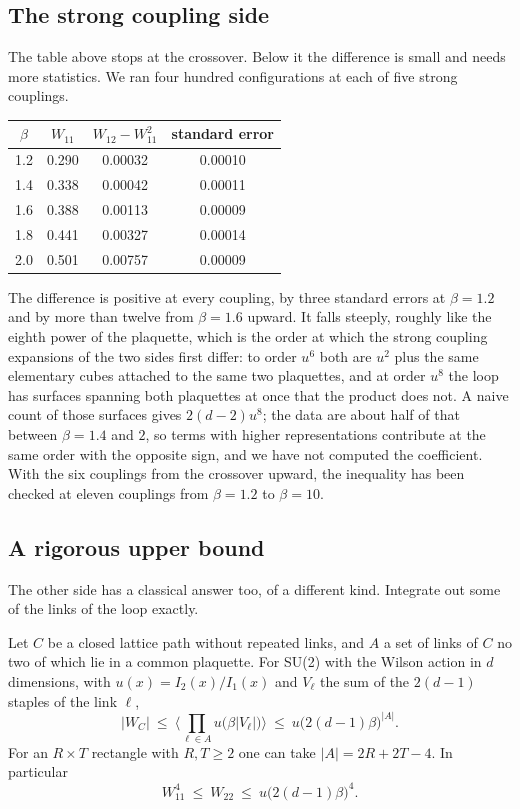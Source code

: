 \subsection{The strong coupling side}

The table above stops at the crossover. Below it the difference is small and needs more statistics. We ran four hundred configurations at each of five strong couplings.

\begin{center}
\small
\begin{tabular}{cccc}
\toprule
$\beta$ & $W_{11}$ & $W_{12}-W_{11}^2$ & standard error \\ \midrule
1.2 & 0.290 & 0.00032 & 0.00010 \\
1.4 & 0.338 & 0.00042 & 0.00011 \\
1.6 & 0.388 & 0.00113 & 0.00009 \\
1.8 & 0.441 & 0.00327 & 0.00014 \\
2.0 & 0.501 & 0.00757 & 0.00009 \\
\bottomrule
\end{tabular}
\end{center}

The difference is positive at every coupling, by three standard errors at $\beta=1.2$ and by more than twelve from $\beta=1.6$ upward. It falls steeply, roughly like the eighth power of the plaquette, which is the order at which the strong coupling expansions of the two sides first differ: to order $u^6$ both are $u^2$ plus the same elementary cubes attached to the same two plaquettes, and at order $u^8$ the loop has surfaces spanning both plaquettes at once that the product does not. A naive count of those surfaces gives $2(d-2)u^8$; the data are about half of that between $\beta=1.4$ and $2$, so terms with higher representations contribute at the same order with the opposite sign, and we have not computed the coefficient. With the six couplings from the crossover upward, the inequality has been checked at eleven couplings from $\beta=1.2$ to $\beta=10$.

\subsection{A rigorous upper bound}

The other side has a classical answer too, of a different kind. Integrate out some of the links of the loop exactly.

\begin{theorem}\label{thm:heatbath}
Let $C$ be a closed lattice path without repeated links, and $A$ a set of links of $C$ no two of which lie in a common plaquette. For SU(2) with the Wilson action in $d$ dimensions, with $u(x)=I_2(x)/I_1(x)$ and $V_\ell$ the sum of the $2(d-1)$ staples of the link $\ell$,
\[
|W_C|\ \le\ \Big\langle\prod_{\ell\in A}u\big(\beta|V_\ell|\big)\Big\rangle\ \le\ u\big(2(d-1)\beta\big)^{|A|}.
\]
For an $R\times T$ rectangle with $R,T\ge2$ one can take $|A|=2R+2T-4$. In particular
\[
W_{11}^4\ \le\ W_{22}\ \le\ u\big(2(d-1)\beta\big)^4 .
\]
\end{theorem}

